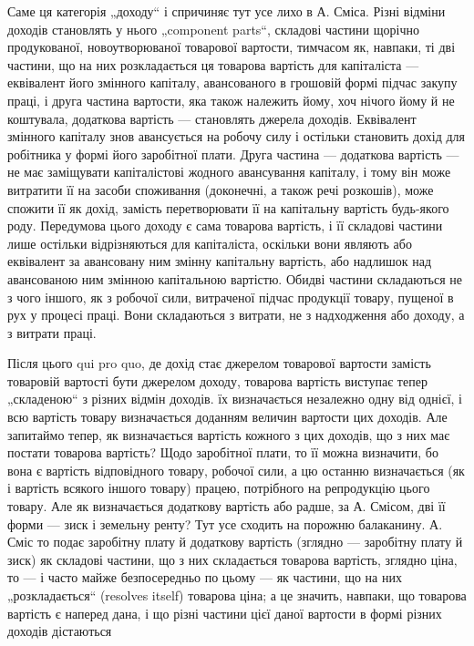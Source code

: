 Саме ця категорія „доходу“ і спричиняє тут усе лихо в А. Сміса.
Різні відміни доходів становлять у нього „component parts“, складові
частини щорічно продукованої, новоутворюваної товарової вартости, тимчасом
як, навпаки, ті дві частини, що на них розкладається ця товарова
вартість для капіталіста — еквівалент його змінного капіталу, авансованого
в грошовій формі підчас закупу праці, і друга частина вартости, яка також
належить йому, хоч нічого йому й не коштувала, додаткова вартість —
становлять джерела доходів. Еквівалент змінного капіталу знов авансується
на робочу силу і остільки становить дохід для робітника у формі його
заробітної плати. Друга частина — додаткова вартість — не має заміщувати
капіталістові жодного авансування капіталу, і тому він може витратити її
на засоби споживання (доконечні, а також речі розкошів), може спожити її
як дохід, замість перетворювати її на капітальну вартість будь-якого роду.
Передумова цього доходу є сама товарова вартість, і її складові частини
лише остільки відрізняються для капіталіста, оскільки вони являють або
еквівалент за авансовану ним змінну капітальну вартість, або надлишок
над авансованою ним змінною капітальною вартістю. Обидві частини складаються
не з чого іншого, як з робочої сили, витраченої підчас продукції
товару, пущеної в рух у процесі праці. Вони складаються з витрати,
не з надходження або доходу, а з витрати праці.

Після цього qui pro quo, де дохід стає джерелом товарової вартости
замість товаровій вартості бути джерелом доходу, товарова
вартість виступає тепер „складеною“ з різних відмін доходів. їх
визначається незалежно одну від однієї, і всю вартість товару визначається
доданням величин вартости цих доходів. Але запитаймо тепер,
як визначається вартість кожного з цих доходів, що з них має постати
товарова вартість? Щодо заробітної плати, то її можна визначити, бо вона
є вартість відповідного товару, робочої сили, а цю останню визначається
(як і вартість всякого іншого товару) працею, потрібного на репродукцію
цього товару. Але як визначається додаткову вартість або радше, за А.
Смісом, дві її форми — зиск і земельну ренту? Тут усе сходить на порожню
балаканину. А. Сміс то подає заробітну плату й додаткову вартість
(зглядно — заробітну плату й зиск) як складові частини, що з них складається
товарова вартість, зглядно ціна, то — і часто майже безпосередньо
по цьому — як частини, що на них „розкладається“ (resolves itself) товарова
ціна; а це значить, навпаки, що товарова вартість є наперед дана,
і що різні частини цієї даної вартости в формі різних доходів дістаються
\parbreak{}  %
